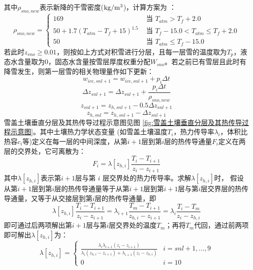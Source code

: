 其中$\rho_{sno,new}$表示新降的干雪密度($\rm kg/m^3$)，计算方案为 \citet{anderson1976point}：
\begin{equation}
\rho_{sno, new}=\begin{cases}
169 & \text { 当 } T_{atm}>T_{f}+2.0 \\ 
50+1.7\left(T_{atm}-T_{f}+15\right)^{1.5}  & \text { 当 } T_{f}-15.0<T_{atm} \leq T_{f}+2.0 \\ 
50 & \text { 当 } T_{atm} \leq T_{f}-15.0
\end{cases}
\end{equation}
若此时$z_{sno} \geq 0.01$，则按如上方式对积雪进行分层，且每一层雪的温度取为$T_p$，液态水含量取为0，固态水含量按雪层厚度权重分配$W_{sno}$。若之前已有雪层且此时有降雪发生，则第一层雪的相关物理量作如下更新：
\begin{equation}
w_{ice, snl+1}=w_{ice, snl+1}+p_{i} \Delta t
\end{equation}
\begin{equation}
\Delta z_{snl+1}=\Delta z_{snl+1}+\frac{p_{i} \Delta t}{\rho_{sno, new}}
\end{equation}
\begin{equation}
z_{snl+1}=z_{h, snl+1}-0.5 \Delta z_{snl+1}
\end{equation}
\begin{equation}
z_{h, snl}=z_{h, snl+1}-\Delta z_{snl+1}
\end{equation}
雪盖土壤垂直分层及其热传导过程示意图见图 \ref{fig:雪盖土壤垂直分层及其热传导过程示意图}。其中土壤热力学状态变量
(如雪盖土壤温度$T_i$，热力传导率$\lambda_i$，体积比热容$c_i$等)定义在每一层的中间深度，从第$i+1$层到第$ i $层的热传导通量$F_i$定义在两层的交界处，它可离散为：
\begin{equation}
F_{i}=\lambda\left[z_{h, i}\right] \frac{T_{i}-T_{i+1}}{z_{i}-z_{i+1}}
\end{equation}
其中$\lambda\left[z_{h,i}\right]$表示第$i+1$层与第 $i$ 层交界处的热力传导率。求解$\lambda\left[z_{h,i}\right]$时，
假设从第$i+1$层到第$ i $层的热传导通量等于从第$i+1$层到第$i+1$层与第$i$层交界层的热传导通量，又等于从交接层到第$i$层的热传导通量，即
\begin{equation}
\lambda\left[z_{h, i}\right] \frac{T_{i}-T_{i+1}}{z_{i}-z_{i+1}}=\lambda_{i+1} \frac{T_{m}-T_{i+1}}{z_{h, i}-z_{i+1}}=\lambda_{i} \frac{T_{i}-T_{m}}{z_{i}-z_{h, i}}
\end{equation}
即可通过后两项解出第$i+1$层与第$i$层交界处的温度$T_m$；再将$T_m$代回，通过前两项即可解出$\lambda\left[z_{h,i}\right]$为：
\begin{equation}
\lambda\left[z_{h, i}\right]=\begin{cases}
\frac{\lambda_{i} \lambda_{i+1}\left(z_{i}-z_{i+1}\right)}{\lambda_{i}\left(z_{h, i}-z_{i+1}\right)+\lambda_{i+1}\left(z_{i}-z_{h, i}\right)} & i=snl+1, \ldots, 9 \\ 
0 & i=10
\end{cases}
\end{equation}
